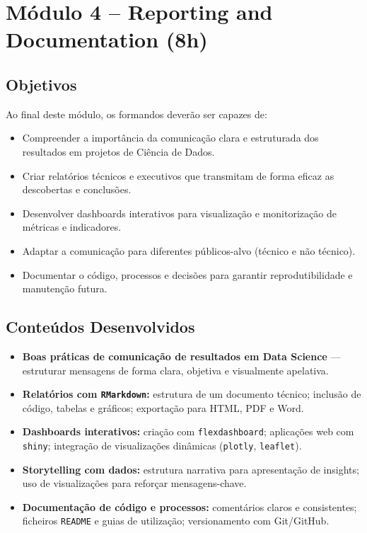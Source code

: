 \section{\textcolor{sectionred}{Módulo 4 – Reporting and Documentation (8h)}}

\subsection{\textcolor{subsectionblue}{Objetivos}}
Ao final deste módulo, os formandos deverão ser capazes de:
\begin{itemize}
  \item Compreender a importância da comunicação clara e estruturada dos resultados em projetos de Ciência de Dados.  
  \item Criar relatórios técnicos e executivos que transmitam de forma eficaz as descobertas e conclusões.  
  \item Desenvolver dashboards interativos para visualização e monitorização de métricas e indicadores.  
  \item Adaptar a comunicação para diferentes públicos-alvo (técnico e não técnico).  
  \item Documentar o código, processos e decisões para garantir reprodutibilidade e manutenção futura.
\end{itemize}

\subsection{\textcolor{subsectionblue}{Conteúdos Desenvolvidos}}
\begin{itemize}
  \item \textbf{Boas práticas de comunicação de resultados em Data Science} — estruturar mensagens de forma clara, objetiva e visualmente apelativa.
  \item \textbf{Relatórios com \texttt{RMarkdown}:} estrutura de um documento técnico; inclusão de código, tabelas e gráficos; exportação para HTML, PDF e Word.
  \item \textbf{Dashboards interativos:} criação com \texttt{flexdashboard}; aplicações web com \texttt{shiny}; integração de visualizações dinâmicas (\texttt{plotly}, \texttt{leaflet}).
  \item \textbf{Storytelling com dados:} estrutura narrativa para apresentação de insights; uso de visualizações para reforçar mensagens-chave.
  \item \textbf{Documentação de código e processos:} comentários claros e consistentes; ficheiros \texttt{README} e guias de utilização; versionamento com Git/GitHub.
\end{itemize}

